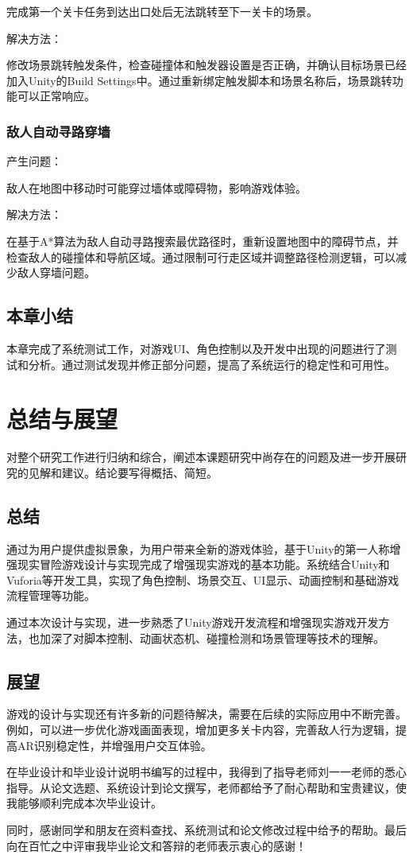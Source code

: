 \documentclass[12pt]{graduate-design-manual}
\begin{document}
完成第一个关卡任务到达出口处后无法跳转至下一关卡的场景。

解决方法：

修改场景跳转触发条件，检查碰撞体和触发器设置是否正确，并确认目标场景已经加入Unity的Build Settings中。通过重新绑定触发脚本和场景名称后，场景跳转功能可以正常响应。

\subsubsection{敌人自动寻路穿墙}
产生问题：

敌人在地图中移动时可能穿过墙体或障碍物，影响游戏体验。

解决方法：

在基于A*算法为敌人自动寻路搜索最优路径时，重新设置地图中的障碍节点，并检查敌人的碰撞体和导航区域。通过限制可行走区域并调整路径检测逻辑，可以减少敌人穿墙问题。

\subsection{本章小结}
本章完成了系统测试工作，对游戏UI、角色控制以及开发中出现的问题进行了测试和分析。通过测试发现并修正部分问题，提高了系统运行的稳定性和可用性。

\section{总结与展望}
对整个研究工作进行归纳和综合，阐述本课题研究中尚存在的问题及进一步开展研究的见解和建议。结论要写得概括、简短。

\subsection{总结}
通过为用户提供虚拟景象，为用户带来全新的游戏体验，基于Unity的第一人称增强现实冒险游戏设计与实现完成了增强现实游戏的基本功能。系统结合Unity和Vuforia等开发工具，实现了角色控制、场景交互、UI显示、动画控制和基础游戏流程管理等功能。

通过本次设计与实现，进一步熟悉了Unity游戏开发流程和增强现实游戏开发方法，也加深了对脚本控制、动画状态机、碰撞检测和场景管理等技术的理解。

\subsection{展望}
游戏的设计与实现还有许多新的问题待解决，需要在后续的实际应用中不断完善。例如，可以进一步优化游戏画面表现，增加更多关卡内容，完善敌人行为逻辑，提高AR识别稳定性，并增强用户交互体验。

\begin{acknowledgement}
在毕业设计和毕业设计说明书编写的过程中，我得到了指导老师刘一一老师的悉心指导。从论文选题、系统设计到论文撰写，老师都给予了耐心帮助和宝贵建议，使我能够顺利完成本次毕业设计。

同时，感谢同学和朋友在资料查找、系统测试和论文修改过程中给予的帮助。最后向在百忙之中评审我毕业论文和答辩的老师表示衷心的感谢！
\end{acknowledgement}
\nocite{*} %


\begin{appendixsection}
\end{appendixsection}
\end{document}
